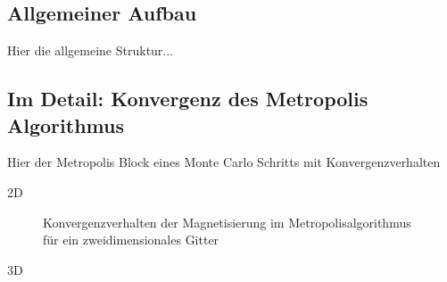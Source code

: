\subsection{Allgemeiner Aufbau}

Hier die allgemeine Struktur...

\subsection{Im Detail: Konvergenz des Metropolis Algorithmus}

Hier der Metropolis Block eines Monte Carlo Schritts mit Konvergenzverhalten

2D

\begin{figure}[H]
	\centering
	\caption{Konvergenzverhalten der Magnetisierung im Metropolisalgorithmus für ein zweidimensionales Gitter}
	\label{mp2dkonv}
\end{figure}

3D

